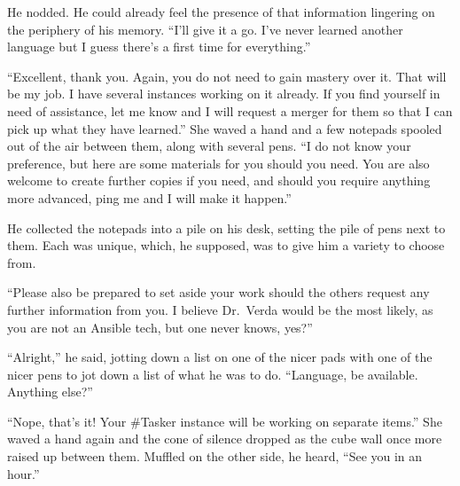 He nodded. He could already feel the presence of that information lingering on the periphery of his memory. ``I'll give it a go. I've never learned another language but I guess there's a first time for everything.''

``Excellent, thank you. Again, you do not need to gain mastery over it. That will be my job. I have several instances working on it already. If you find yourself in need of assistance, let me know and I will request a merger for them so that I can pick up what they have learned.'' She waved a hand and a few notepads spooled out of the air between them, along with several pens. ``I do not know your preference, but here are some materials for you should you need. You are also welcome to create further copies if you need, and should you require anything more advanced, ping me and I will make it happen.''

He collected the notepads into a pile on his desk, setting the pile of pens next to them. Each was unique, which, he supposed, was to give him a variety to choose from.

``Please also be prepared to set aside your work should the others request any further information from you. I believe Dr.~Verda would be the most likely, as you are not an Ansible tech, but one never knows, yes?''

``Alright,'' he said, jotting down a list on one of the nicer pads with one of the nicer pens to jot down a list of what he was to do. ``Language, be available. Anything else?''

``Nope, that's it! Your \#Tasker instance will be working on separate items.'' She waved a hand again and the cone of silence dropped as the cube wall once more raised up between them. Muffled on the other side, he heard, ``See you in an hour.''
